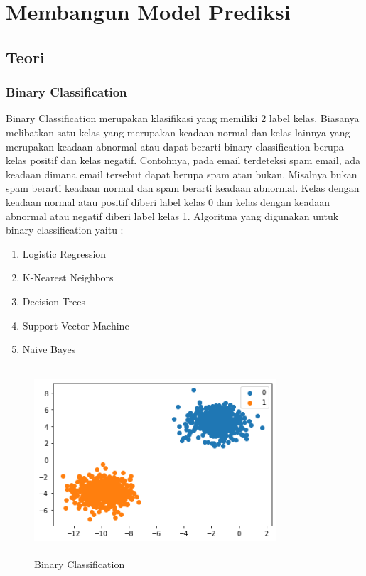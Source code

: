 \chapter{Membangun Model Prediksi}

\section{Teori}
	\subsection{Binary Classification}
	Binary Classification merupakan klasifikasi yang memiliki 2 label kelas. Biasanya melibatkan satu kelas yang merupakan keadaan normal dan kelas lainnya yang merupakan keadaan abnormal atau dapat berarti binary classification berupa kelas positif dan kelas negatif. Contohnya, pada email terdeteksi spam email, ada keadaan dimana email tersebut dapat berupa spam atau bukan.  Misalnya bukan spam berarti keadaan normal dan spam berarti keadaan abnormal. Kelas dengan keadaan normal atau positif diberi label kelas 0 dan kelas dengan keadaan abnormal atau negatif diberi label kelas 1. 
	\newline Algoritma yang digunakan untuk binary classification yaitu :
	\begin{enumerate}
		\item Logistic Regression
		\item K-Nearest Neighbors
		\item Decision Trees
		\item Support Vector Machine
		\item Naive Bayes
	\end{enumerate}

	\begin{figure}[!htbp]
		\centering
		\includegraphics[width=9cm,height=7cm]{figures/Binary_Classification.png}
		\caption{Binary Classification}
		\label{penanda}
	\end{figure}

